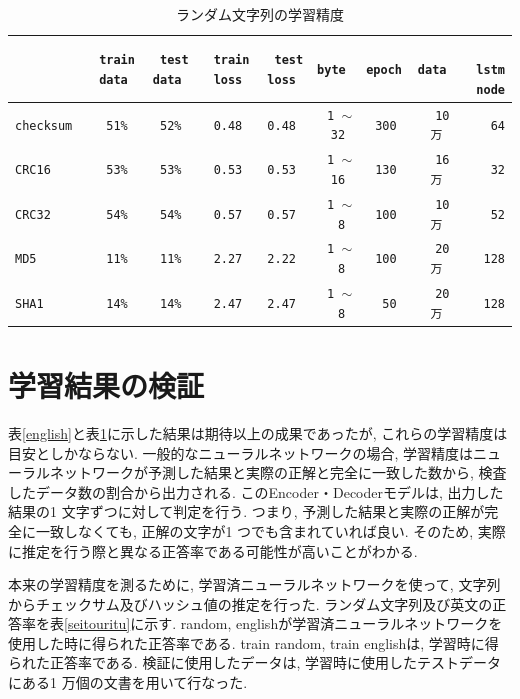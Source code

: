 \documentclass[11pt]{jbook}
\begin{document}
\begin{table}[htp]
   \begin{center}
    \caption{ランダム文字列の学習精度}
    \small
    \smallskip
    \begin{tabular}{|l|r|r|r|r|r|r|r|r|}
    \hline
       &\texttt{train data }&\texttt{test data }&\texttt{train loss }&\texttt{test loss  }&\texttt{byte }&\texttt{epoch }&\texttt{data }&　\texttt{lstm node} \\ \hline
    \texttt{checksum   }&\texttt{51\% }&\texttt{52\% }&\texttt{0.48 }&\texttt{0.48 }&\texttt{1 $\sim$ 32 }&\texttt{300 }&\texttt{10 万 }&\texttt{64}\\ \hline
    \texttt{CRC16   }&\texttt{53\% }&\texttt{53\% }&\texttt{0.53 }&\texttt{0.53 }&\texttt{1 $\sim$ 16 }&\texttt{130 }&\texttt{16 万 }&\texttt{32}\\ \hline
    \texttt{CRC32   }&\texttt{54\% }&\texttt{54\% }&\texttt{0.57 }&\texttt{0.57 }&\texttt{1 $\sim$ 8 }&\texttt{100 }&\texttt{10 万 }&\texttt{52}\\ \hline
    \texttt{MD5  }&\texttt{11\% }&\texttt{11\% }&\texttt{2.27  }&\texttt{2.22  }&\texttt{1 $\sim$ 8 }&\texttt{100 }&\texttt{20 万 }&\texttt{128}\\ \hline
    \texttt{SHA1    }&\texttt{14\% }&\texttt{14\% }&\texttt{2.47  }&\texttt{2.47  }&\texttt{1 $\sim$ 8 }&\texttt{50 }&\texttt{20 万 }&\texttt{128}\\ \hline
    \end{tabular}
    \label{random}
   \end{center}

\end{table}


\section{学習結果の検証}

表\ref{english}と表\ref{random}に示した結果は期待以上の成果であったが, これらの学習精度は目安としかならない.
一般的なニューラルネットワークの場合, 学習精度はニューラルネットワークが予測した結果と実際の正解と完全に一致した数から, 検査したデータ数の割合から出力される.
このEncoder・Decoderモデル\cite{seq2seq}は, 出力した結果の1 文字ずつに対して判定を行う.
つまり, 予測した結果と実際の正解が完全に一致しなくても, 正解の文字が1 つでも含まれていれば良い.
そのため, 実際に推定を行う際と異なる正答率である可能性が高いことがわかる.

本来の学習精度を測るために, 学習済ニューラルネットワークを使って, 文字列からチェックサム及びハッシュ値の推定を行った.
ランダム文字列及び英文の正答率を表\ref{seitouritu}に示す.
random, englishが学習済ニューラルネットワークを使用した時に得られた正答率である.
train random, train englishは, 学習時に得られた正答率である.
検証に使用したデータは, 学習時に使用したテストデータにある1 万個の文書を用いて行なった.
\end{document}
